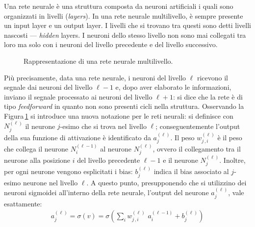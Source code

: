 Una rete neurale è una struttura composta da neuroni artificiali i quali sono organizzati in livelli (\textit{layers}). In una rete neurale multilivello, è sempre presente un input layer e un output layer. I livelli che si trovano tra questi sono detti livelli nascosti — \textit{hidden} layers. I neuroni dello stesso livello non sono mai collegati tra loro ma solo con i neuroni del livello precedente e del livello successivo.
% 
\begin{figure}[!b]
    \centering
    
    \caption[Rappresentazione di una rete neurale multilivello.]{Rappresentazione di una rete neurale multilivello.}\label{fig:neural-network}
\end{figure}
% 
Più precisamente, data una rete neurale, i neuroni del livello $\ell$ ricevono il segnale dai neuroni del livello $\ell-1$ e, dopo aver elaborato le informazioni, inviano il segnale processato ai neuroni del livello $\ell+1$: si dice che la rete è di tipo \textit{feedforward} in quanto non sono presenti cicli nella struttura. Osservando la Figura\,\ref{fig:neural-network} si introduce una nuova notazione per le reti neurali: si definisce con $N^{(\ell)}_j$ il neurone $j$-esimo che si trova nel livello $\ell$; conseguentemente l'output della sua funzione di attivazione è identificato da $a^{(\ell)}_j$. Il peso $w^{(\ell)}_{j\,,i}$ è il peso che collega il neurone $N^{(\ell - 1)}_i$ al neurone $N^{(\ell)}_j$, ovvero il collegamento tra il neurone alla posizione $i$ del livello precedente $\ell-1$ e il neurone $N^{(\ell)}_j$. Inoltre, per ogni neurone vengono esplicitati i bias: $b^{(\ell)}_j$ indica il bias associato al $j$-esimo neurone nel livello $\ell$. A questo punto, presupponendo che si utilizzino dei neuroni sigmoidei all'interno della rete neurale, l'output del neurone  $a^{(\ell)}_j$, vale esattamente:
% 
\begin{gather*}
     a^{(\ell)}_j = \sigma\left( v \right) = \sigma\left( \sum_i w^{(\ell)}_{j\,,i} \,\, a^{(\ell - 1)}_i + b^{(\ell)}_j \right)
\end{gather*}

